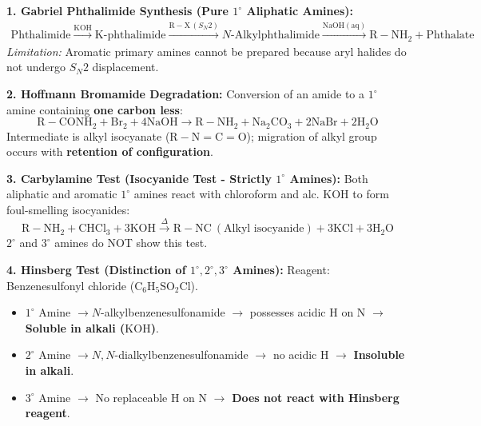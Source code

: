 \documentclass[10pt,a4paper]{article}
\begin{document}
\begin{formulabox}
\textbf{1. Gabriel Phthalimide Synthesis (Pure $1^\circ$ Aliphatic Amines):}
\begin{align*}
  \text{Phthalimide} \xrightarrow{\mathrm{KOH}} \text{K-phthalimide} \xrightarrow{\mathrm{R-X} \, (S_N2)} N\text{-Alkylphthalimide} \xrightarrow{\mathrm{NaOH (aq)}} \mathrm{R-NH_2} + \text{Phthalate}
\end{align*}
\textit{Limitation:} Aromatic primary amines cannot be prepared because aryl halides do not undergo $S_N2$ displacement.

\textbf{2. Hoffmann Bromamide Degradation:}
Conversion of an amide to a $1^\circ$ amine containing \textbf{one carbon less}:
\begin{equation}
  \mathrm{R-CONH_2} + \mathrm{Br_2} + 4\mathrm{NaOH} \longrightarrow \mathrm{R-NH_2} + \mathrm{Na_2CO_3} + 2\mathrm{NaBr} + 2\mathrm{H_2O}
\end{equation}
Intermediate is alkyl isocyanate ($\mathrm{R-N=C=O}$); migration of alkyl group occurs with \textbf{retention of configuration}.

\textbf{3. Carbylamine Test (Isocyanide Test - Strictly $1^\circ$ Amines):}
Both aliphatic and aromatic $1^\circ$ amines react with chloroform and alc. $\mathrm{KOH}$ to form foul-smelling isocyanides:
\begin{equation}
  \mathrm{R-NH_2} + \mathrm{CHCl_3} + 3\mathrm{KOH} \xrightarrow{\Delta} \mathrm{R-NC} \ (\text{Alkyl isocyanide}) + 3\mathrm{KCl} + 3\mathrm{H_2O}
\end{equation}
$2^\circ$ and $3^\circ$ amines do NOT show this test.

\textbf{4. Hinsberg Test (Distinction of $1^\circ, 2^\circ, 3^\circ$ Amines):}
Reagent: Benzenesulfonyl chloride ($\mathrm{C_6H_5SO_2Cl}$).
\begin{itemize}
  \item $1^\circ$ Amine $\to N$-alkylbenzenesulfonamide $\to$ possesses acidic H on N $\to$ \textbf{Soluble in alkali ($\mathrm{KOH}$)}.
  \item $2^\circ$ Amine $\to N,N$-dialkylbenzenesulfonamide $\to$ no acidic H $\to$ \textbf{Insoluble in alkali}.
  \item $3^\circ$ Amine $\to$ No replaceable H on N $\to$ \textbf{Does not react with Hinsberg reagent}.
\end{itemize}
\end{formulabox}
\end{document}
